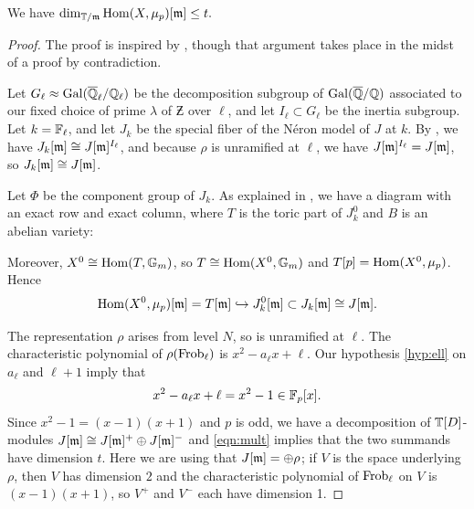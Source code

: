 \documentclass{article} \usepackage[active]{srcltx}
\begin{document}
\begin{proposition}
We have
$
\dim_{\mathbb{T}/\mathfrak{m}} \operatorname{Hom}(X,\mu_p)[\mathfrak{m}] \leq t.
$
\end{proposition}
\begin{proof}
  The proof is inspired by \cite[Prop.~7.7]{ribet:report}, though that
  argument takes place in the midst of a proof by contradiction.

  Let $G_{\ell}\approx \operatorname{Gal}(\overline{\mathbb{Q}}_{\ell}/\mathbb{Q}_{\ell})$ be the decomposition
  subgroup of $\operatorname{Gal}(\overline{\mathbb{Q}}/\mathbb{Q})$ associated to our fixed choice of prime
  $\lambda$ of $\Zbar$ over $\ell$, and let $I_{\ell}\subset G_{\ell}$ be the
  inertia subgroup.  Let $k=\mathbb{F}_{\ell}$, and let $J_k$ be the special fiber
  of the N\'eron model of $J$ at $k$.  By \cite[Lem.~2]{serre-tate},
  we have $J_k[\mathfrak{m}] \cong J[\mathfrak{m}]^{I_{\ell}}$, and because $\rho$ is unramified at
  $\ell$, we have $J[\mathfrak{m}]^{I_{\ell}} = J[\mathfrak{m}]$, so $J_k[\mathfrak{m}] \cong J[\mathfrak{m}]$.

Let $\Phi$ be the component group of $J_k$.
As explained in \cite[\S4]{conrad-stein:compgroup},  we have 
a diagram with an exact row and exact column, 
where $T$ is the toric part of $J^0_k$ and $B$ is an abelian variety:
\begin{center}
\end{center}

Moreover, $X^0 \cong \operatorname{Hom}(T,\mathbb{G}_m)$, so $T\cong \operatorname{Hom}(X^0,\mathbb{G}_m)$ and $T[p]=\operatorname{Hom}(X^0,\mu_p)$.
Hence 
\begin{equation}\label{eqn:minc}
  \operatorname{Hom}(X^0, \mu_p)[\mathfrak{m}]= T[\mathfrak{m}] \hookrightarrow J^0_k[\mathfrak{m}] \subset J_k[\mathfrak{m}] \cong J[\mathfrak{m}].
\end{equation}

The representation $\rho$ arises from level $N$, so is unramified
at $\ell$. The characteristic polynomial of
$\rho(\operatorname{Frob}_{\ell})$ is $x^2 - a_{\ell}x + \ell$.
Our hypothesis \ref{hyp:ell} on $a_{\ell}$ and $\ell+1$
imply that
$$
  x^2 - a_{\ell}x + \ell = x^2 - 1 \in \mathbb{F}_p[x].
$$
Since $x^2-1 = (x-1)(x+1)$ and $p$ is odd,
we have a decomposition of $\mathbb{T}[D]$-modules 
$J[\mathfrak{m}]\cong J[\mathfrak{m}]^+ \oplus J[\mathfrak{m}]^-$ and
\eqref{eqn:mult} implies that the two summands have 
dimension $t$.
Here we are using that $J[\mathfrak{m}] = \oplus \rho$; if
$V$ is the space underlying $\rho$, then $V$ 
has dimension $2$ and the characteristic
polynomial of $\operatorname{Frob}_{\ell}$ on $V$ is $(x-1)(x+1)$, 
so $V^+$ and $V^-$ each have dimension 1.  


\end{proof}
\end{document}

